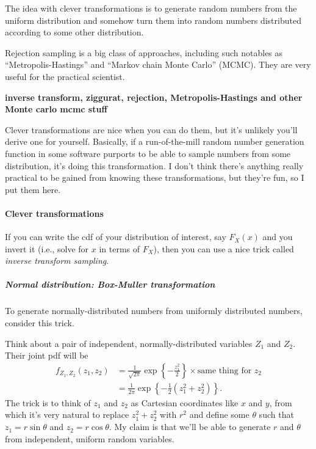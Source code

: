\documentclass{book}
\begin{document}
The idea with clever transformations is to generate random numbers from
the uniform distribution and somehow turn them into random numbers
distributed according to some other distribution.

Rejection sampling is a big class of approaches, including such notables
as ``Metropolis-Hastings'' and ``Markov chain Monte Carlo'' (MCMC). They
are very useful for the practical scientist.

\textbf{inverse transform, ziggurat, rejection, Metropolis-Hastings and
other Monte carlo mcmc stuff}

Clever transformations are nice when you can do them, but it's unlikely
you'll derive one for yourself. Basically, if a run-of-the-mill random
number generation function in some software purports to be able to
sample numbers from some distribution, it's doing this transformation. I
don't think there's anything really practical to be gained from knowing
these transformations, but they're fun, so I put them here.

\paragraph{Clever transformations}\label{clever-transformations}

If you can write the cdf of your distribution of interest, say
\(F_X(x)\) and you invert it (i.e., solve for \(x\) in terms of
\(F_X\)), then you can use a nice trick called \emph{inverse transform
sampling}.

\subparagraph{Normal distribution: Box-Muller
transformation}\label{normal-distribution-box-muller-transformation}

To generate normally-distributed numbers from uniformly distributed
numbers, consider this trick.

Think about a pair of independent, normally-distributed variables
\(Z_1\) and \(Z_2\). Their joint pdf will be \[
\begin{aligned}
f_{Z_1,Z_2}(z_1, z_2) &=
  \frac{1}{\sqrt{2\pi}} \exp\left\{ -\frac{z_1^2}{2} \right\} \times
  \text{same thing for $z_2$} \\
  &= \frac{1}{2\pi} \exp\left\{ -\frac{1}{2} \left( z_1^2 + z_2^2 \right) \right\}.
\end{aligned}
\] The trick is to think of \(z_1\) and \(z_2\) as Cartesian coordinates
like \(x\) and \(y\), from which it's very natural to replace
\(z_1^2 + z_2^2\) with \(r^2\) and define some \(\theta\) such that
\(z_1 = r \sin \theta\) and \(z_2 = r \cos \theta\). My claim is that
we'll be able to generate \(r\) and \(\theta\) from independent, uniform
random variables.
\end{document}
